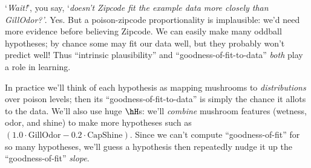  `\emph{Wait!}', you say,
  `\emph{doesn't Zipcode fit the example data more closely than GillOdor?'}.
  Yes.  But a poison-zipcode proportionality is implausible: we'd need
  more evidence before believing Zipcode.  We can easily make many oddball
  hypotheses; by chance some may fit our data well, but they probably
  won't predict well!
  Thus
  ``intrinsic plausibility'' and ``goodness-of-fit-to-data''
  \emph{both} play a role in learning.

  In practice we'll think of each hypothesis as mapping mushrooms to
  \emph{distributions} over poison levels; then its
  ``goodness-of-fit-to-data'' is simply the chance it allots to the
  data.
  We'll also use huge $\hH$s: we'll \emph{combine} mushroom features
  (wetness, odor, and shine) to make more hypotheses such as
  $
    (1.0 \cdot \text{GillOdor} - 0.2\cdot \text{CapShine})
  $.
  Since we can't compute ``goodness-of-fit'' for so many hypotheses,
  we'll guess a hypothesis
  then repeatedly
  nudge it up the ``goodness-of-fit'' \emph{slope}.



